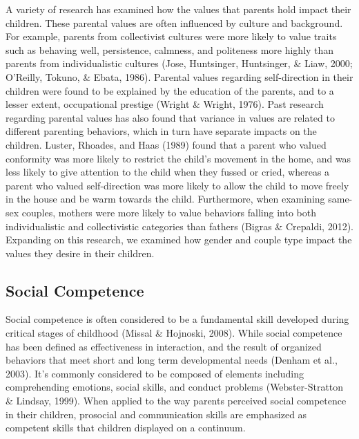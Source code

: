 \documentclass[man]{apa6}
\begin{document}
A variety of research has examined how the values that parents hold impact their children. These parental values are often influenced by culture and background. For example, parents from collectivist cultures were more likely to value traits such as behaving well, persistence, calmness, and politeness more highly than parents from individualistic cultures (Jose, Huntsinger, Huntsinger, \& Liaw, 2000; O'Reilly, Tokuno, \& Ebata, 1986). Parental values regarding self-direction in their children were found to be explained by the education of the parents, and to a lesser extent, occupational prestige (Wright \& Wright, 1976). Past research regarding parental values has also found that variance in values are related to different parenting behaviors, which in turn have separate impacts on the children. Luster, Rhoades, and Haas (1989) found that a parent who valued conformity was more likely to restrict the child's movement in the home, and was less likely to give attention to the child when they fussed or cried, whereas a parent who valued self-direction was more likely to allow the child to move freely in the house and be warm towards the child. Furthermore, when examining same-sex couples, mothers were more likely to value behaviors falling into both individualistic and collectivistic categories than fathers (Bigras \& Crepaldi, 2012). Expanding on this research, we examined how gender and couple type impact the values they desire in their children.

\hypertarget{social-competence}{%
\subsection{Social Competence}\label{social-competence}}

Social competence is often considered to be a fundamental skill developed during critical stages of childhood (Missal \& Hojnoski, 2008). While social competence has been defined as effectiveness in interaction, and the result of organized behaviors that meet short and long term developmental needs (Denham et al., 2003). It's commonly considered to be composed of elements including comprehending emotions, social skills, and conduct problems (Webster-Stratton \& Lindsay, 1999). When applied to the way parents perceived social competence in their children, prosocial and communication skills are emphasized as competent skills that children displayed on a continuum.
\end{document}
